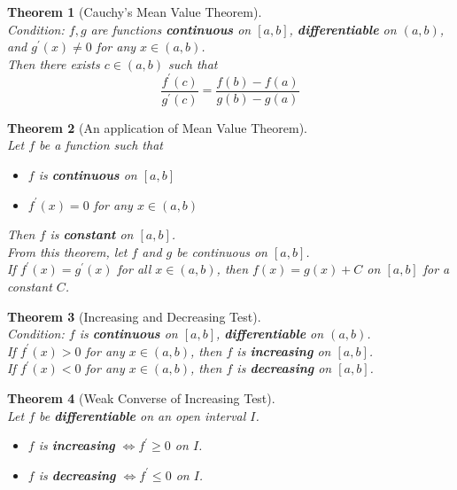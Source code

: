 \documentclass[12pt]{article}
\newtheorem{theorem}{Theorem}[section]
\theoremstyle{definition}
\begin{document}
\begin{theorem}[Cauchy's Mean Value Theorem]
\hfill\\
\normalfont Condition: $f,g$ are functions \textbf{continuous} on $[a,b]$, \textbf{differentiable} on $(a,b)$, and $g^\prime (x)\neq 0$ for any $x\in (a,b)$. \\
Then there exists $c\in (a,b)$ such that
\[
\frac{f^\prime (c)}{g^\prime (c)}=\frac{f(b)-f(a)}{g(b)-g(a)}
\]
\end{theorem}
\begin{theorem}[An application of Mean Value Theorem]
\hfill\\
\normalfont Let $f$ be a function such that
\begin{itemize}
\item $f$ is \textbf{continuous} on $[a,b]$
\item $f^\prime (x)=0$ for any $x\in(a,b)$
\end{itemize}
Then $f$ is \textbf{constant} on $[a,b]$.\\
From this theorem, let $f$ and $g$ be continuous on $[a, b]$.\\
If $f^\prime (x)=g^\prime (x)$ for all $x\in(a,b)$, then $f(x)=g(x)+C$ on $[a,b]$ for a constant $C$.
\end{theorem}
\begin{theorem}[Increasing and Decreasing Test]
\hfill\\
\normalfont Condition: $f$ is \textbf{continuous} on $[a,b]$, \textbf{differentiable} on $(a,b)$.\\
If $f^\prime (x)>0$ for any $x\in(a,b)$, then $f$ is \textbf{increasing} on $[a,b]$.\\
If $f^\prime (x)<0$ for any $x\in(a,b)$, then $f$ is \textbf{decreasing} on $[a,b]$.\\
\end{theorem}
\begin{theorem}[Weak Converse of Increasing Test]
\hfill\\
\normalfont Let $f$ be \textbf{differentiable} on an open interval $I$.
\begin{itemize}
\item $f$ is \textbf{increasing} $\Leftrightarrow f^\prime\geq 0$ on $I$.
\item $f$ is \textbf{decreasing} $\Leftrightarrow f^\prime\leq 0$ on $I$.
\end{itemize}
\end{theorem}
\end{document}
